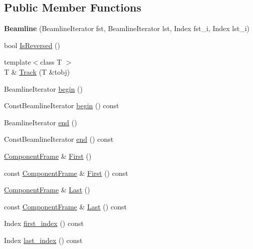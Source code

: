 \subsection*{Public Member Functions}
\begin{DoxyCompactItemize}
\item 
\mbox{\label{classAcceleratorModel_1_1Beamline_a3474fa3882d6c64f585fd1d31f33bbab}} 
{\bfseries Beamline} (Beamline\+Iterator fst, Beamline\+Iterator lst, Index fst\+\_\+i, Index lst\+\_\+i)
\item 
bool \hyperlink{classAcceleratorModel_1_1Beamline_acbb49274dda0a8bbc7daa0a3a845508e}{Is\+Reversed} ()
\item 
{\footnotesize template$<$class T $>$ }\\T \& \hyperlink{classAcceleratorModel_1_1Beamline_af48fc0105707f1b09e5b343ffa829854}{Track} (T \&tobj)
\item 
Beamline\+Iterator \hyperlink{classAcceleratorModel_1_1Beamline_a1cccebda06318f2ed33b12a19cf7acba}{begin} ()
\item 
Const\+Beamline\+Iterator \hyperlink{classAcceleratorModel_1_1Beamline_a1580e7da07af01517c3d552464b267ed}{begin} () const
\item 
Beamline\+Iterator \hyperlink{classAcceleratorModel_1_1Beamline_a190fe2e2aeca28999af7b07beea84d60}{end} ()
\item 
Const\+Beamline\+Iterator \hyperlink{classAcceleratorModel_1_1Beamline_af0f0f0244723579b42b2e893a2273ea4}{end} () const
\item 
\hyperlink{classComponentFrame}{Component\+Frame} \& \hyperlink{classAcceleratorModel_1_1Beamline_a56c50274a705cd04a6059ffe384c897a}{First} ()
\item 
const \hyperlink{classComponentFrame}{Component\+Frame} \& \hyperlink{classAcceleratorModel_1_1Beamline_aa1a924ddf820afe8c914a4ff03893bc3}{First} () const
\item 
\hyperlink{classComponentFrame}{Component\+Frame} \& \hyperlink{classAcceleratorModel_1_1Beamline_aebb83c56d1f6b346f08f29cad78a4896}{Last} ()
\item 
const \hyperlink{classComponentFrame}{Component\+Frame} \& \hyperlink{classAcceleratorModel_1_1Beamline_a3d9e8887cc1b7cfbc0d497f749af3950}{Last} () const
\item 
Index \hyperlink{classAcceleratorModel_1_1Beamline_a67b5d69c05315b04b3f0fb4c28fe40a9}{first\+\_\+index} () const
\item 
Index \hyperlink{classAcceleratorModel_1_1Beamline_a5e20d3e994c496cf16744d0a54bd26a0}{last\+\_\+index} () const
\end{DoxyCompactItemize}


